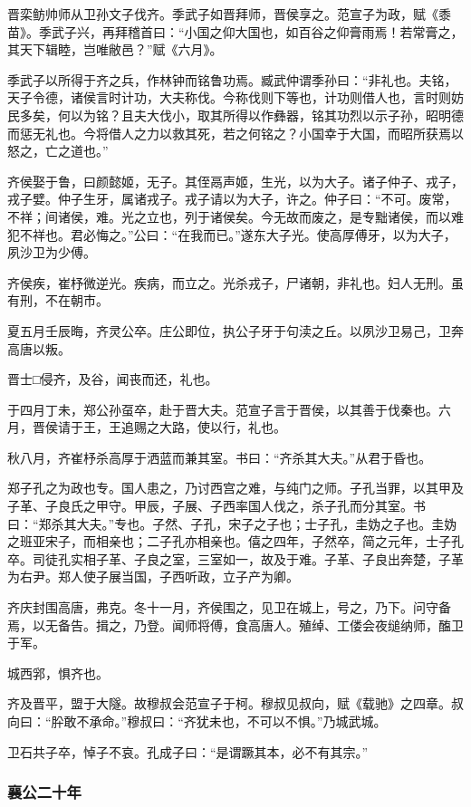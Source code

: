 \documentclass[]{article}
\begin{document}
晋栾鲂帅师从卫孙文子伐齐。季武子如晋拜师，晋侯享之。范宣子为政，赋《黍苗》。季武子兴，再拜稽首曰：``小国之仰大国也，如百谷之仰膏雨焉！若常膏之，其天下辑睦，岂唯敝邑？''赋《六月》。

季武子以所得于齐之兵，作林钟而铭鲁功焉。臧武仲谓季孙曰：``非礼也。夫铭，天子令德，诸侯言时计功，大夫称伐。今称伐则下等也，计功则借人也，言时则妨民多矣，何以为铭？且夫大伐小，取其所得以作彝器，铭其功烈以示子孙，昭明德而惩无礼也。今将借人之力以救其死，若之何铭之？小国幸于大国，而昭所获焉以怒之，亡之道也。''

齐侯娶于鲁，曰颜懿姬，无子。其侄鬲声姬，生光，以为大子。诸子仲子、戎子，戎子嬖。仲子生牙，属诸戎子。戎子请以为大子，许之。仲子曰：``不可。废常，不祥；间诸侯，难。光之立也，列于诸侯矣。今无故而废之，是专黜诸侯，而以难犯不祥也。君必悔之。''公曰：``在我而已。''遂东大子光。使高厚傅牙，以为大子，夙沙卫为少傅。

齐侯疾，崔杼微逆光。疾病，而立之。光杀戎子，尸诸朝，非礼也。妇人无刑。虽有刑，不在朝市。

夏五月壬辰晦，齐灵公卒。庄公即位，执公子牙于句渎之丘。以夙沙卫易己，卫奔高唐以叛。

晋士□侵齐，及谷，闻丧而还，礼也。

于四月丁未，郑公孙虿卒，赴于晋大夫。范宣子言于晋侯，以其善于伐秦也。六月，晋侯请于王，王追赐之大路，使以行，礼也。

秋八月，齐崔杼杀高厚于洒蓝而兼其室。书曰：``齐杀其大夫。''从君于昏也。

郑子孔之为政也专。国人患之，乃讨西宫之难，与纯门之师。子孔当罪，以其甲及子革、子良氏之甲守。甲辰，子展、子西率国人伐之，杀子孔而分其室。书曰：``郑杀其大夫。''专也。子然、子孔，宋子之子也；士子孔，圭妫之子也。圭妫之班亚宋子，而相亲也；二子孔亦相亲也。僖之四年，子然卒，简之元年，士子孔卒。司徒孔实相子革、子良之室，三室如一，故及于难。子革、子良出奔楚，子革为右尹。郑人使子展当国，子西听政，立子产为卿。

齐庆封围高唐，弗克。冬十一月，齐侯围之，见卫在城上，号之，乃下。问守备焉，以无备告。揖之，乃登。闻师将傅，食高唐人。殖绰、工偻会夜缒纳师，醢卫于军。

城西郛，惧齐也。

齐及晋平，盟于大隧。故穆叔会范宣子于柯。穆叔见叔向，赋《载驰》之四章。叔向曰：``肸敢不承命。''穆叔曰：``齐犹未也，不可以不惧。''乃城武城。

卫石共子卒，悼子不哀。孔成子曰：``是谓蹶其本，必不有其宗。''

\hypertarget{header-n2090}{%
\subsubsection{襄公二十年}\label{header-n2090}}
\end{document}

